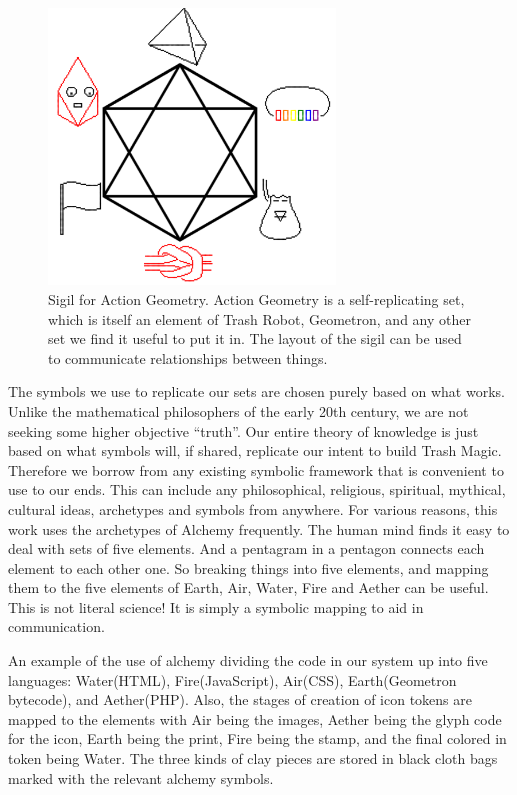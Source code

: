 \begin{figure}
	\centering
	\includegraphics[width=3in]{figures/magic/actiongeometrysigil.png}
	\caption[actiongeometrysigil]
	{Sigil for Action Geometry.  Action Geometry is a self-replicating set, which is itself an element of Trash Robot, Geometron, and any other set we find it useful to put it in.  The layout of the sigil can be used to communicate relationships between things.}
\end{figure}


The symbols we use to replicate our sets are chosen purely based on what works.  Unlike the mathematical philosophers of the early 20th century, we are not seeking some higher objective ``truth''.  Our entire theory of knowledge is just based on what symbols will, if shared, replicate our intent to build Trash Magic.  Therefore we borrow from any existing symbolic framework that is convenient to use to our ends.  This can include any philosophical, religious, spiritual, mythical, cultural ideas, archetypes and symbols from anywhere.  For various reasons, this work uses the archetypes of Alchemy frequently.  The human mind finds it easy to deal with sets of five elements. And a pentagram in a pentagon connects each element to each other one.  So breaking things into five elements, and mapping them to the five elements of Earth, Air, Water, Fire and Aether can be useful.  This is not literal science! It is simply a symbolic mapping to aid in communication.  

An example of the use of alchemy dividing the code in our system up into five languages: Water(HTML), Fire(JavaScript), Air(CSS), Earth(Geometron bytecode), and Aether(PHP).  Also, the stages of creation of icon tokens are mapped to the elements with Air being the images, Aether being the glyph code for the icon, Earth being the print, Fire being the stamp, and the final colored in token being Water.  The three kinds of clay pieces are stored in black cloth bags marked with the relevant alchemy symbols.

